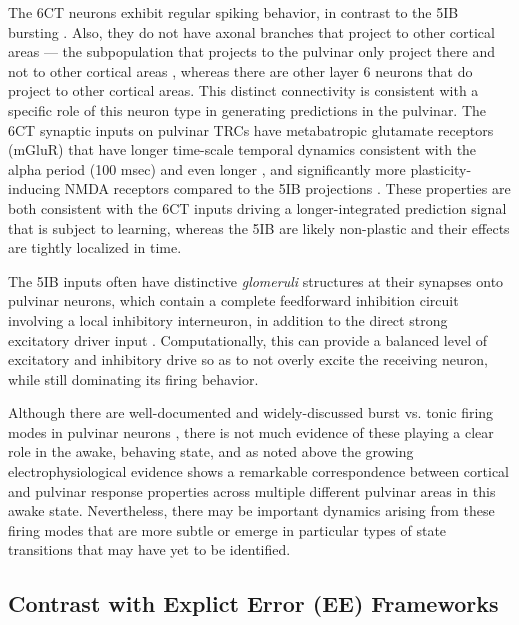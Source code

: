 \documentclass[11pt,twoside]{article}
\newif\myifpdf
\begin{document}
The 6CT neurons exhibit regular spiking behavior, in contrast to the 5IB bursting \citep{Thomson10,ThomsonLamy07}. Also, they do not have axonal branches that project to other cortical areas --- the subpopulation that projects to the pulvinar only project there and not to other cortical areas \citep{PetrofViaeneSherman12}, whereas there are other layer 6 neurons that do project to other cortical areas.  This distinct connectivity is consistent with a specific role of this neuron type in generating predictions in the pulvinar.   The 6CT synaptic inputs on pulvinar TRCs have metabatropic glutamate receptors (mGluR) that have longer time-scale temporal dynamics consistent with the alpha period (100 msec) and even longer \citep{Sherman14}, and significantly more plasticity-inducing NMDA receptors compared to the 5IB projections \citep{UsreySherman18}.  These properties are both consistent with the 6CT inputs driving a longer-integrated prediction signal that is subject to learning, whereas the 5IB are likely non-plastic and their effects are tightly localized in time. 

The 5IB inputs often have distinctive \emph{glomeruli} structures at their synapses onto pulvinar neurons, which contain a complete feedforward inhibition circuit involving a local inhibitory interneuron, in addition to the direct strong excitatory driver input \citep{WilsonBoseShermanEtAl84}.  Computationally, this can provide a balanced level of excitatory and inhibitory drive so as to not overly excite the receiving neuron, while still dominating its firing behavior.

Although there are well-documented and widely-discussed burst vs. tonic firing modes in pulvinar neurons \citep{ShermanGuillery06}, there is not much evidence of these playing a clear role in the awake, behaving state, and as noted above the growing electrophysiological evidence shows a remarkable correspondence between cortical and pulvinar response properties across multiple different pulvinar areas in this awake state.  Nevertheless, there may be important dynamics arising from these firing modes that are more subtle or emerge in particular types of state transitions that may have yet to be identified.

\subsection{Contrast with Explict Error (EE) Frameworks}
\end{document}
